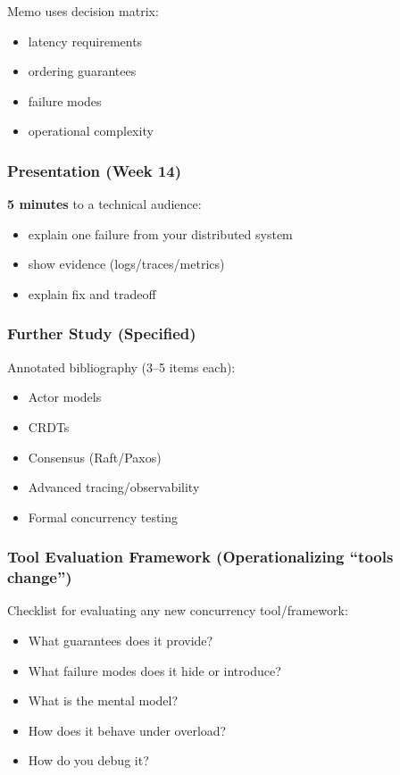 \documentclass[11pt,a4paper]{article}
\begin{document}
	Memo uses decision matrix:
	\begin{itemize}[leftmargin=*]
		\item latency requirements
		\item ordering guarantees
		\item failure modes
		\item operational complexity
	\end{itemize}
	
	\subsubsection*{Presentation (Week 14)}
	\textbf{5 minutes} to a technical audience:
	\begin{itemize}[leftmargin=*]
		\item explain one failure from your distributed system
		\item show evidence (logs/traces/metrics)
		\item explain fix and tradeoff
	\end{itemize}
	
	\subsubsection*{Further Study (Specified)}
	Annotated bibliography (3--5 items each):
	\begin{itemize}[leftmargin=*]
		\item Actor models
		\item CRDTs
		\item Consensus (Raft/Paxos)
		\item Advanced tracing/observability
		\item Formal concurrency testing
	\end{itemize}
	
	\subsubsection*{Tool Evaluation Framework (Operationalizing ``tools change'')}
	Checklist for evaluating any new concurrency tool/framework:
	\begin{itemize}[leftmargin=*]
		\item What guarantees does it provide?
		\item What failure modes does it hide or introduce?
		\item What is the mental model?
		\item How does it behave under overload?
		\item How do you debug it?
	\end{itemize}
	
\end{document}
